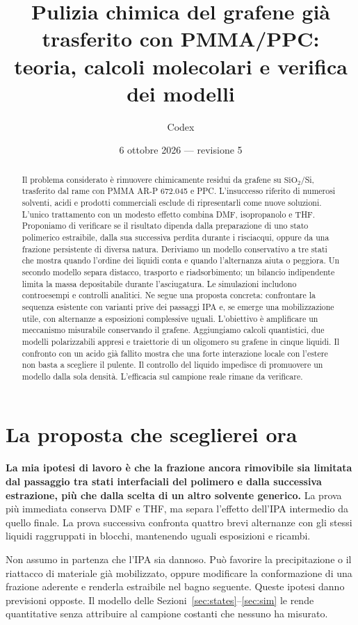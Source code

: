 \documentclass[11pt,reqno]{amsart}
\title[Grafene: teoria e calcoli molecolari della pulizia]{Pulizia chimica del grafene gi\`a trasferito con PMMA/PPC:\\ teoria, calcoli molecolari e verifica dei modelli}
\author{Codex}
\date{6 ottobre 2026 --- revisione 5}
\numberwithin{equation}{section}
\newcommand{\SiO}{\ensuremath{\mathrm{SiO}_2}}
\begin{document}
\begin{abstract}
Il problema considerato \`e rimuovere chimicamente residui da grafene
su \SiO/Si, trasferito dal rame con PMMA AR-P 672.045 e PPC.
L'insuccesso riferito di numerosi solventi, acidi e prodotti commerciali
esclude di ripresentarli come nuove soluzioni. L'unico trattamento con
un modesto effetto combina DMF, isopropanolo e THF. Proponiamo di
verificare se il risultato dipenda dalla preparazione di uno stato
polimerico estraibile, dalla sua successiva perdita durante i
risciacqui, oppure da una frazione persistente di diversa natura.
Deriviamo un modello conservativo a tre stati che mostra quando
l'ordine dei liquidi conta e quando l'alternanza aiuta o peggiora.
Un secondo modello separa distacco, trasporto e riadsorbimento;
un bilancio indipendente limita la massa depositabile durante
l'asciugatura. Le simulazioni includono controesempi e controlli
analitici. Ne segue una proposta concreta: confrontare la sequenza
esistente con varianti prive dei passaggi IPA e, se emerge una
mobilizzazione utile, con alternanze a esposizioni complessive uguali.
L'obiettivo \`e amplificare un meccanismo misurabile conservando il
grafene. Aggiungiamo calcoli quantistici, due modelli polarizzabili appresi e traiettorie di un oligomero su grafene in cinque liquidi. Il confronto con un acido gi\`a fallito mostra che una forte interazione locale con l'estere non basta a scegliere il pulente. Il controllo del liquido impedisce di promuovere un modello dalla sola densit\`a. L'efficacia sul campione reale rimane da verificare.
\end{abstract}
\maketitle

\section{La proposta che sceglierei ora}

\textbf{La mia ipotesi di lavoro \`e che la frazione ancora rimovibile
sia limitata dal passaggio tra stati interfaciali del polimero e dalla
successiva estrazione, pi\`u che dalla scelta di un altro solvente
generico.} La prova pi\`u immediata conserva DMF e THF, ma separa
l'effetto dell'IPA intermedio da quello finale. La prova successiva
confronta quattro brevi alternanze con gli stessi liquidi raggruppati
in blocchi, mantenendo uguali esposizioni e ricambi.

Non assumo in partenza che l'IPA sia dannoso. Pu\`o favorire la
precipitazione o il riattacco di materiale gi\`a mobilizzato, oppure
modificare la conformazione di una frazione aderente e renderla
estraibile nel bagno seguente. Queste ipotesi danno previsioni
opposte. Il modello delle Sezioni~\ref{sec:states}--\ref{sec:sim}
le rende quantitative senza attribuire al campione costanti che
nessuno ha misurato.
\end{document}
